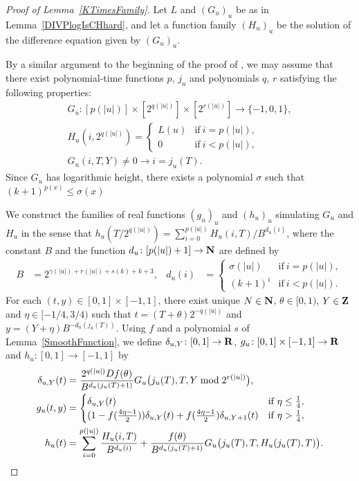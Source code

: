 \begin{proof}[Proof of Lemma~\ref{KTimesFamily}]
Let $L$ and $(G_u)_u$ be as in Lemma~\ref{DIVPlogIsCHhard},
and let a function family $(H_u)_u$ be the solution of the difference equation given by $(G_u)_u$.

By a similar argument to the beginning of the proof of \cite[Lemma 4.1]{kawamura2010lipschitz},
we may assume that there exist polynomial-time functions $p$, $j_u$
and polynomials $q$, $r$ satisfying the following properties:
\begin{gather}
 G_u \colon [p(|u|)] \times [2^{q(|u|)}] \times [2^{r(|u|)}] \to \{-1, 0, 1\},
 \\
 H_u(i, 2^{q(|u|)}) = \begin{cases}
		       L(u) & \text{if} \ i=p(|u|), \\
		       0 & \text{if} \ i<p(|u|), 
		      \end{cases}
 \\
 G_u(i, T, Y) \neq 0 \to i = j_u(T).
\end{gather}
Since $G_u$ has logarithmic height,
there exists a polynomial $\sigma$ such that $(k+1)^{p(x)} \le \sigma(x)$


We construct the families of real functions $(g_u)_u$ and $(h_u)_u$ simulating $G _u$ and $H _u$ 
in the sense that $h_u(T/2^{q(|u|)}) = \sum^{p(|u|)}_{i = 0}H_u(i, T)/B^{d_u(i)}$, 
where the constant $B$ and the function $d_u \colon [p(|u|)+1] \to \mathbf N$ are 
defined by
  \begin{align}
   B &= 2^{\gamma(|u|) + r(|u|) + s(k) + k + 3}, 
   &
   d_u(i) &= 
   \begin{cases}
    \sigma(|u|) & \text{if} \ i=p(|u|), 
    \\
    (k+1)^i & \text{if} \ i<p(|u|).
   \end{cases}
  \end{align}
For each $(t, y) \in [0,1] \times [-1, 1]$,
there exist unique $N \in \mathbf N$, $\theta \in [0,1)$, $Y \in \mathbf Z$ and $\eta \in [-1/4, 3/4)$
such that $t = (T + \theta)2^{-q(|u|)}$ and $y = (Y + \eta)B^{-d_u(j_u(T))}$.
Using $f$ and a polynomial $s$ of Lemma~\ref{SmoothFunction},
we define 
$\delta_{u,Y} \colon [0,1] \to \mathbf R$,
$
g _u \colon [0, 1] \times [-1, 1] \to \mathbf R
$ and $
h _u \colon [0, 1] \to [-1, 1]
$ by
  \begin{align}
    \label{eq:delta}
   \delta_{u, Y} (t) &= \frac{2^{q(|u|)} D f(\theta)}{B^{d_u(j_u(T)+1)}} 
   G_u \bigl( j_u(T), T, Y \bmod 2^{r(|u|)} \bigr),
   \\
  \label{eq:gu}
  g_u(t,y) 
  &= \begin{cases}
     \delta_{u, Y}(t)
     & \text{if} \ \eta \le \frac 1 4, 
     \\
     ( 1-f ( \frac{4\eta-1}{2})) \delta_{u, Y}(t)
     + f ( \frac{4\eta-1}{2}) \delta_{u,Y+1}(t)
     & \text{if} \ \eta > \frac 1 4,
    \end{cases}
   \\
  h_u(t) 
   &= \sum^{p(|u|)}_{i=0} \frac{H_u(i, T)}{B^{d_u(i)}}  
  + \frac{f(\theta)}{B^{d_u(j_u(T)+1)}} G_u \bigl( j_u(T), T, H_u(j_u(T), T) \bigr) .
  \label{eq:hu}
  \end{align}


\end{proof}
